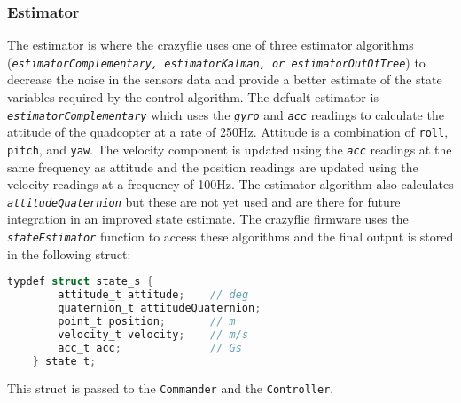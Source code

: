 \documentclass[10pt, a4paper]{article}
\newcommand{\textFunc}[1]{\texttt{\textit{#1}}}
\newcommand{\textDef}[1]{\texttt{#1}}
\begin{document}
    \subsubsection{Estimator}
    \label{estimator}
        The estimator is where the crazyflie uses one of three estimator algorithms (\textFunc{estimatorComplementary, estimatorKalman, or estimatorOutOfTree}) to decrease the noise in the sensors data and provide a better estimate of the state variables required by the control algorithm. The defualt estimator is \textFunc{estimatorComplementary} which uses the \textFunc{gyro} and \textFunc{acc} readings to calculate the attitude of the quadcopter at a rate of 250Hz. Attitude is a combination of \textDef{roll}, \textDef{pitch}, and \textDef{yaw}. The velocity component is updated using the \textFunc{acc} readings at the same frequency as attitude and the position readings are updated using the velocity readings at a frequency of 100Hz. The estimator algorithm also calculates \textFunc{attitudeQuaternion} but these are not yet used and are there for future integration in an improved state estimate. The crazyflie firmware uses the \textFunc{stateEstimator} function to access these algorithms and the final output is stored in the following struct:
        \begin{lstlisting}[language=C]
    typdef struct state_s {
        attitude_t attitude;    // deg
        quaternion_t attitudeQuaternion;
        point_t position;       // m
        velocity_t velocity;    // m/s
        acc_t acc;              // Gs
    } state_t;
        \end{lstlisting}
        This struct is passed to the \textDef{Commander} and the \textDef{Controller}.
\end{document}
